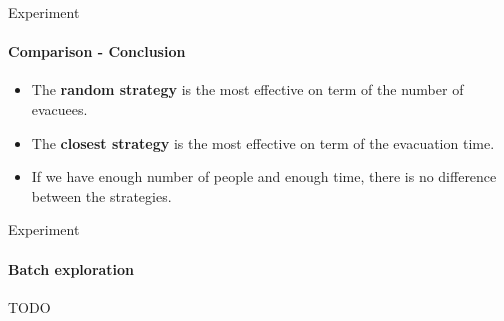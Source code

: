 \documentclass{beamer}
\begin{document}
\begin{frame}[fragile]{Experiment}
\framesubtitle{Comparison - Conclusion}

\begin{itemize}
    \item The \textbf{random strategy} is the most effective on term of the number of evacuees.
    \item The \textbf{closest strategy} is the most effective on term of the evacuation time.
    \item If we have enough number of people and enough time, there is no difference between the strategies.
\end{itemize}

\end{frame}
    

\begin{frame}[fragile]{Experiment}
\framesubtitle{Batch exploration}

TODO

\end{frame}

\backmatter
\end{document}

